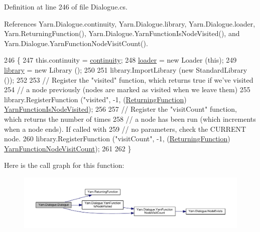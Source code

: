 Definition at line 246 of file Dialogue.\-cs.



References Yarn.\-Dialogue.\-continuity, Yarn.\-Dialogue.\-library, Yarn.\-Dialogue.\-loader, Yarn.\-Returning\-Function(), Yarn.\-Dialogue.\-Yarn\-Function\-Is\-Node\-Visited(), and Yarn.\-Dialogue.\-Yarn\-Function\-Node\-Visit\-Count().


\begin{DoxyCode}
246                                                          \{
247             this.continuity = \hyperlink{a00082_ae94eaa4b03b432422f5d205fabe37ff5}{continuity};
248             \hyperlink{a00082_a98bbe0ac2ccadeeeb7e05e3e6e19f2e0}{loader} = \textcolor{keyword}{new} Loader (\textcolor{keyword}{this});
249             \hyperlink{a00082_ae660d4cfb6e296358d2f61d8ee74c66a}{library} = \textcolor{keyword}{new} Library ();
250 
251             library.ImportLibrary (\textcolor{keyword}{new} StandardLibrary ());
252 
253             \textcolor{comment}{// Register the "visited" function, which returns true if we've visited}
254             \textcolor{comment}{// a node previously (nodes are marked as visited when we leave them)}
255             library.RegisterFunction (\textcolor{stringliteral}{"visited"}, -1, (\hyperlink{a00041_a5177bf74fbfe7303fac9d8236c2e514b}{ReturningFunction})
      \hyperlink{a00082_a1ab129bd84381928531d503304ca08d6}{YarnFunctionIsNodeVisited});
256 
257             \textcolor{comment}{// Register the "visitCount" function, which returns the number of times}
258             \textcolor{comment}{// a node has been run (which increments when a node ends). If called with}
259             \textcolor{comment}{// no parameters, check the CURRENT node.}
260             library.RegisterFunction (\textcolor{stringliteral}{"visitCount"}, -1, (\hyperlink{a00041_a5177bf74fbfe7303fac9d8236c2e514b}{ReturningFunction})
      \hyperlink{a00082_a10c9f22d3f55e74f091cd6069c431094}{YarnFunctionNodeVisitCount});
261 
262         \}
\end{DoxyCode}


Here is the call graph for this function\-:
\nopagebreak
\begin{figure}[H]
\begin{center}
\leavevmode
\includegraphics[width=350pt]{a00082_a349debf4c4b8d48e3d80ff31ad380b0e_cgraph}
\end{center}
\end{figure}




